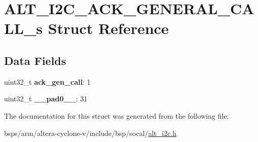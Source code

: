 \hypertarget{structALT__I2C__ACK__GENERAL__CALL__s}{}\section{A\+L\+T\+\_\+\+I2\+C\+\_\+\+A\+C\+K\+\_\+\+G\+E\+N\+E\+R\+A\+L\+\_\+\+C\+A\+L\+L\+\_\+s Struct Reference}
\label{structALT__I2C__ACK__GENERAL__CALL__s}
\subsection*{Data Fields}
\begin{DoxyCompactItemize}
\item 
\mbox{\label{structALT__I2C__ACK__GENERAL__CALL__s_afd12b40a11af1d6301a1bcd00e1c0ad7}} 
uint32\+\_\+t {\bfseries ack\+\_\+gen\+\_\+call}\+: 1
\item 
\mbox{\label{structALT__I2C__ACK__GENERAL__CALL__s_a30071b4a59e6cd96afff7dcaaecb0aa1}} 
uint32\+\_\+t {\bfseries \+\_\+\+\_\+pad0\+\_\+\+\_\+}\+: 31
\end{DoxyCompactItemize}


The documentation for this struct was generated from the following file\+:\begin{DoxyCompactItemize}
\item 
bsps/arm/altera-\/cyclone-\/v/include/bsp/socal/\mbox{\hyperlink{socal_2alt__i2c_8h}{alt\+\_\+i2c.\+h}}\end{DoxyCompactItemize}
